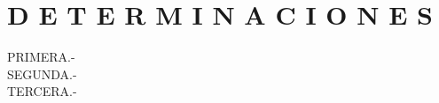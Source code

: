 \section*{D E T E R M I N A C I O N E S}
\begin{description}
    \item[PRIMERA.-] \lipsum[1]
    \item[SEGUNDA.-] \lipsum[2]
    \item[TERCERA.-] \lipsum[3]
\end{description}